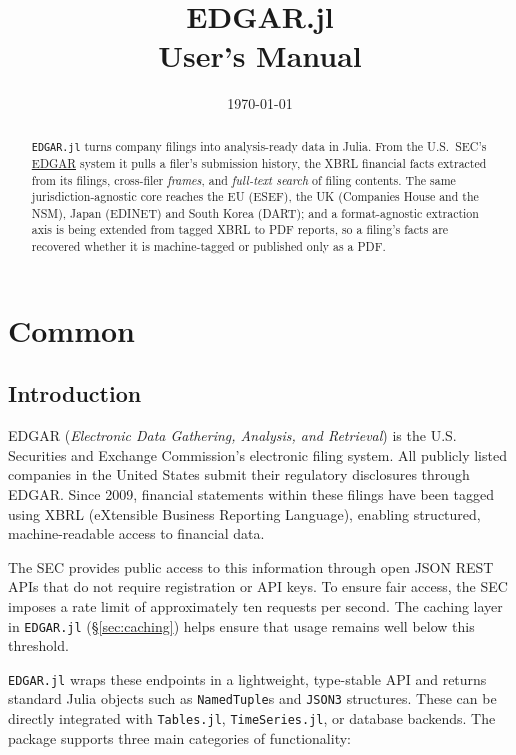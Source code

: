 \documentclass[11pt,a4paper]{report}
\title{\textbf{EDGAR.jl}\\[0.3em]
       \large User's Manual}
\author{}
\date{\today}
\begin{document}
\maketitle

\begin{abstract}
\noindent
\texttt{EDGAR.jl} turns company filings into analysis-ready data in Julia. From the U.S.\ SEC's
\href{https://www.sec.gov/search-filings/edgar-application-programming-interfaces}{EDGAR} system it pulls a
filer's submission history, the XBRL financial facts extracted from its filings, cross-filer
\emph{frames}, and \emph{full-text search} of filing contents. The same jurisdiction-agnostic core reaches
the EU (ESEF), the UK (Companies House and the NSM), Japan (EDINET) and South
Korea (DART); and a format-agnostic extraction axis is being extended from tagged XBRL to PDF reports, so a filing's facts are recovered whether it is machine-tagged or published only as a PDF.
\end{abstract}

\tableofcontents
\vspace{1em}

\part{Common}

\chapter{Introduction}
\label{sec:intro}
EDGAR (\emph{Electronic Data Gathering, Analysis, and Retrieval}) is the U.S. Securities and Exchange Commission's electronic filing system. All publicly listed companies in the United States submit their regulatory disclosures through EDGAR. Since 2009, financial statements within these filings have been tagged using XBRL (eXtensible Business Reporting Language), enabling structured, machine-readable access to financial data.

The SEC provides public access to this information through open JSON REST APIs that do not require registration or API keys. To ensure fair access, the SEC imposes a rate limit of approximately ten requests per second. The caching layer in \texttt{EDGAR.jl} (\S\ref{sec:caching}) helps ensure that usage remains well below this threshold.

\texttt{EDGAR.jl} wraps these endpoints in a lightweight, type-stable API and returns standard Julia objects such as \texttt{NamedTuple}s and \texttt{JSON3} structures. These can be directly integrated with \texttt{Tables.jl}, \texttt{TimeSeries.jl}, or database backends. The package supports three main categories of functionality:
\end{document}
